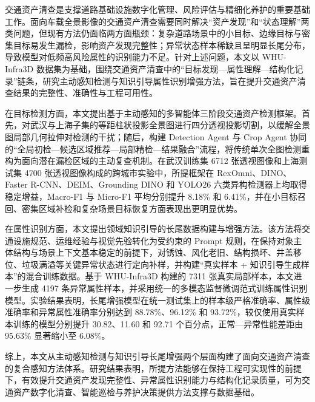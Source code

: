 交通资产清查是支撑道路基础设施数字化管理、风险评估与精细化养护的重要基础工作。面向车载全景影像的交通资产清查需要同时解决“资产发现”和“状态理解”两类问题，但现有方法仍面临两方面瓶颈：复杂道路场景中的小目标、边缘目标与密集目标易发生漏检，影响资产发现完整性；异常状态样本稀缺且呈明显长尾分布，导致模型对低频高风险属性的识别能力不足。针对上述问题，本文以 WHU-Infra3D 数据集为基础，围绕交通资产清查中的“目标发现—属性理解—结构化记录”链条，研究主动感知检测与知识引导属性识别增强方法，旨在提升交通资产清查结果的完整性、准确性与工程可用性。

在目标检测方面，本文提出基于主动感知的多智能体三阶段交通资产检测框架。首先，对武汉与上海子集的等距柱状投影全景图进行四分透视投影切割，以缓解全景图局部几何拉伸对检测的干扰；随后，构建 Detection Agent 与 Crop Agent 协同的“全局初检—候选区域推荐—局部精检—结果融合”流程，将传统单次全图检测重构为面向潜在漏检区域的主动复查机制。在武汉训练集 6712 张透视图像和上海测试集 4700 张透视图像构成的跨城市实验中，所提框架在 RexOmni、DINO、Faster R-CNN、DEIM、Grounding DINO 和 YOLO26 六类异构检测器上均取得稳定增益，Macro-F1 与 Micro-F1 平均分别提升 8.18\% 和 6.41\%，并在小目标召回、密集区域补检和复杂场景目标恢复方面表现出更明显优势。

在属性识别方面，本文提出领域知识引导的长尾数据构建与增强方法。该方法将交通设施规范、运维经验与视觉先验转化为受约束的 Prompt 规则，在保持对象主体结构与场景上下文基本稳定的前提下，对锈蚀、风化老旧、结构损坏、井盖移位、垃圾满溢等关键异常状态进行定向补样，并构建“真实样本 + 知识引导生成样本”的混合训练数据。基于 WHU-Infra3D 构建的 7311 张真实局部样本，本文进一步生成 4197 条异常属性样本，并采用统一的多模态监督微调范式训练属性识别模型。实验结果表明，长尾增强模型在统一测试集上的样本级严格准确率、属性级准确率和异常属性准确率分别达到 88.78\%、96.12\% 和 93.72\%，较仅使用真实样本训练的模型分别提升 30.82、11.60 和 92.71 个百分点，正常—异常性能差距由 95.63\% 显著缩小至 6.08\%。

综上，本文从主动感知检测与知识引导长尾增强两个层面构建了面向交通资产清查的复合感知方法体系。研究结果表明，所提方法能够在保持工程可实现性的前提下，有效提升交通资产发现完整性、异常属性识别能力与结构化记录质量，可为交通资产数字化清查、智能巡检与养护决策提供方法支撑与数据基础。
